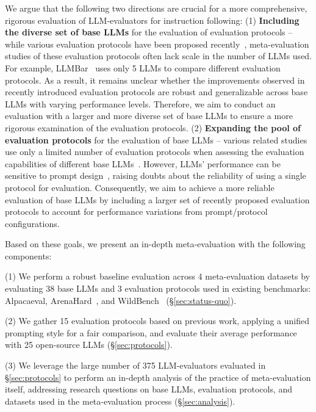 \documentclass[11pt]{article}
\begin{document}
% 
% 
We argue that the following two directions are crucial for a more comprehensive, rigorous evaluation of LLM-evaluators for instruction following: 
(1) \textbf{Including the diverse set of base LLMs} for the evaluation of evaluation protocols -- while various evaluation protocols have been proposed recently~\cite{gong2023coascore, saha2023branchsolvemerge, chan2024chateval, jeong2024prepair}, meta-evaluation studies of these evaluation protocols often lack scale in the number of LLMs used. 
For example, LLMBar~\citep{zeng2024evaluating} uses only 5 LLMs to compare different evaluation protocols. 
% 
As a result, it remains unclear whether the improvements observed in recently introduced evaluation protocols are robust and generalizable across base LLMs with varying performance levels.
Therefore, we aim to conduct an evaluation with a larger and more diverse set of base LLMs to ensure a more rigorous examination of the evaluation protocols.
% 
(2) \textbf{Expanding the pool of evaluation protocols} for the evaluation of base LLMs -- various related studies use only a limited number of evaluation protocols when assessing the evaluation capabilities of different base LLMs~\cite{liu-etal-2023-g, dubois2024alpacafarm}.
However, LLMs' performance can be sensitive to prompt design~\cite{sclar2024quantifying}, raising doubts about the reliability of using a single protocol for evaluation.
Consequently, we aim to achieve a more reliable evaluation of base LLMs by including a larger set of recently proposed evaluation protocols to account for performance variations from prompt/protocol configurations.
% 

Based on these goals, we present an in-depth meta-evaluation with the following components:

% 

\noindent (1) We perform a robust baseline evaluation across 4 meta-evaluation datasets by evaluating 38 base LLMs and 3 evaluation protocols used in existing benchmarks: Alpacaeval, ArenaHard~\cite{li2024crowdsourced}, and WildBench~\cite{lin2024wildbench} (\S\ref{sec:status-quo}).

\noindent (2) We gather 15 evaluation protocols based on previous work, applying a unified prompting style for a fair comparison, and evaluate their average performance with 25 open-source LLMs (\S\ref{sec:protocols}).

\noindent (3) We leverage the large number of 375 LLM-evaluators evaluated in \S\ref{sec:protocols} to perform an in-depth analysis of the practice of meta-evaluation itself, addressing research questions on base LLMs, evaluation protocols, and datasets used in the meta-evaluation process (\S\ref{sec:analysis}).
\end{document}
